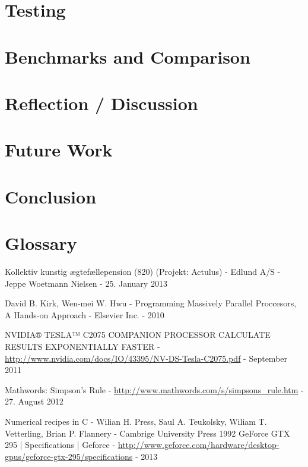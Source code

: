 \documentclass[oribibl]{llncs}
\numberwithin{equation}{section}
\begin{document}
	\section{Testing}
		
	
	\label{testing}
		
	\section{Benchmarks and Comparison}

	
	\label{bandc}
	
	\section{Reflection / Discussion}		
		
	
	\label{reflection}
		
	\section{Future Work}
	
	
	\label{futurework}
	
	\section{Conclusion}
	
	
	\label{conclusion}
		
	\section{Glossary}
	
	
		
	\begin{thebibliography}{9}
			 Kollektiv kunstig ægtefællepension (820) (Projekt: Actulus) - Edlund A/S - Jeppe Woetmann Nielsen - 25. January 2013 
			
			 David B. Kirk, Wen-mei W. Hwu - Programming Massively Parallel Proccesors, A Hands-on Approach - Elsevier Inc. - 2010
			
			 NVIDIA® TESLA™ C2075 COMPANION PROCESSOR CALCULATE RESULTS EXPONENTIALLY FASTER  - \url{http://www.nvidia.com/docs/IO/43395/NV-DS-Tesla-C2075.pdf} - September 2011
			
			 Mathwords: Simpson's Rule - \url{http://www.mathwords.com/s/simpsons_rule.htm} - 27. August 2012
			
			 Numerical recipes in C - Wilian H. Press, Saul A. Teukolsky, Wiliam T. Vetterling, Brian P. Flannery - Cambrige University Press 1992
			 GeForce GTX 295 | Specifications | Geforce - \url{http://www.geforce.com/hardware/desktop-gpus/geforce-gtx-295/specifications} - 2013
	\end{thebibliography}
	
	
	
\end{document}
